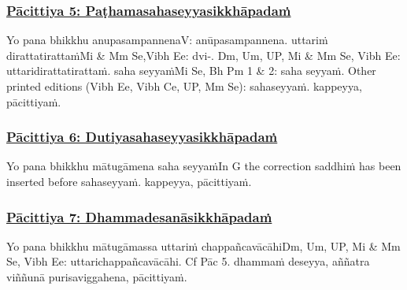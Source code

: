 \subsubsection*{\hyperref[exp5]{Pācittiya 5: Paṭhamasahaseyyasikkhāpadaṁ}}
\label{pac5}

Yo pana bhikkhu anupasampannena\makeatletter\hyperlink{endnote-appendix}\makeatother V: anūpasampannena. uttariṁ dirattatirattaṁ\makeatletter\hyperlink{endnote-appendix}\makeatother Mi & Mm Se,Vibh Ee: dvi-. Dm, Um, UP, Mi & Mm Se, Vibh Ee: uttaridirattatirattaṁ. saha seyyaṁ\makeatletter\hyperlink{endnote-appendix}\makeatother Mi Se, Bh Pm 1 & 2: saha seyyaṁ. Other printed editions (Vibh Ee, Vibh Ce, UP, Mm Se): sahaseyyaṁ. kappeyya, pācittiyaṁ.



\subsubsection*{\hyperref[exp6]{Pācittiya 6: Dutiyasahaseyyasikkhāpadaṁ}}
\label{pac6}

Yo pana bhikkhu mātugāmena saha seyyaṁ\makeatletter\hyperlink{endnote-appendix}\makeatother In G the correction saddhiṁ has been inserted before sahaseyyaṁ. kappeyya, pācittiyaṁ.



\subsubsection*{\hyperref[exp7]{Pācittiya 7: Dhammadesanāsikkhāpadaṁ}}
\label{pac7}

Yo pana bhikkhu mātugāmassa uttariṁ chappañcavācāhi\makeatletter\hyperlink{endnote-appendix}\makeatother Dm, Um, UP, Mi & Mm Se, Vibh Ee: uttarichappañcavācāhi. Cf Pāc 5. dhammaṁ deseyya, aññatra viññunā purisaviggahena, pācittiyaṁ.



